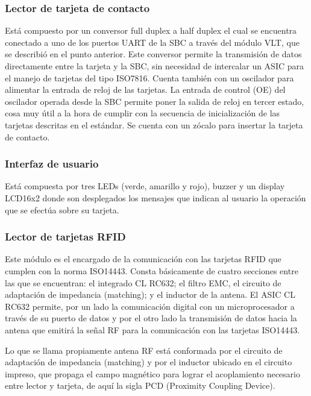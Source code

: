 \documentclass[%
        final,
        notitlepage,
        narroweqnarray,
        inline,
        ]{ieee}
\begin{document}
\subsubsection{Lector de tarjeta de contacto}

Está compuesto por un conversor full duplex a half duplex el cual se encuentra conectado a uno de los puertos UART de la SBC a través del módulo VLT, que se describió en el punto anterior. Este conversor permite la transmisión de datos directamente entre la tarjeta y la SBC, sin necesidad de intercalar un ASIC para el manejo de tarjetas del tipo ISO7816. Cuenta también con un oscilador para alimentar la entrada de reloj de las tarjetas. La entrada de control (OE) del oscilador operada desde la SBC permite poner la salida de reloj en tercer estado, cosa muy útil a la hora de cumplir con la secuencia de inicialización de las tarjetas descritas en el estándar. Se cuenta con un zócalo para insertar la tarjeta de contacto.


\subsubsection{Interfaz de usuario}

Está compuesta por tres LEDs (verde, amarillo y rojo), buzzer y un display LCD16x2 donde son desplegados los mensajes que indican al usuario la operación que se efectúa sobre su tarjeta.


\subsubsection{Lector de tarjetas RFID}

Este módulo es el encargado de la comunicación con las tarjetas RFID que cumplen con la norma ISO14443. Consta básicamente de cuatro secciones entre las que se encuentran: el integrado CL RC632; el filtro EMC, el circuito de adaptación de impedancia (matching); y el inductor de la antena. 
El ASIC CL RC632 permite, por un lado la comunicación digital con un microprocesador a través de su puerto de datos y por el otro lado la transmisión de datos hacia la antena que emitirá la señal RF para la comunicación con las tarjetas ISO14443.

Lo que se llama propiamente antena RF está conformada por el circuito de adaptación de impedancia (matching) y por el inductor ubicado en el circuito impreso, que propaga el campo magnético para lograr el acoplamiento necesario entre lector y tarjeta, de aquí la sigla PCD (Proximity Coupling Device).
\end{document}
